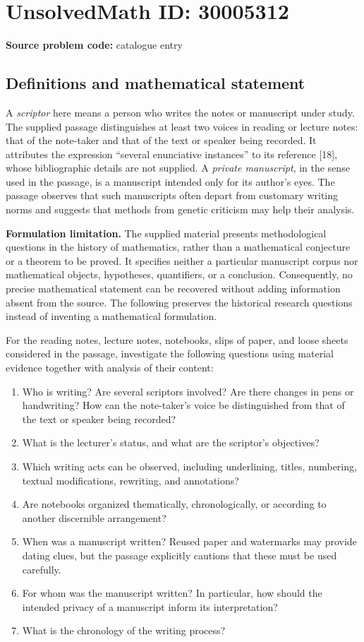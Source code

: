 \documentclass[11pt]{article}
\begin{document}
\section*{UnsolvedMath ID: 30005312}
\textbf{Source problem code:} catalogue entry
\subsection{Definitions and mathematical statement}
A \emph{scriptor} here means a person who writes the notes or manuscript under study. The supplied passage distinguishes at least two voices in reading or lecture notes: that of the note-taker and that of the text or speaker being recorded. It attributes the expression ``several enunciative instances'' to its reference [18], whose bibliographic details are not supplied. A \emph{private manuscript}, in the sense used in the passage, is a manuscript intended only for its author's eyes. The passage observes that such manuscripts often depart from customary writing norms and suggests that methods from genetic criticism may help their analysis.

\textbf{Formulation limitation.} The supplied material presents methodological questions in the history of mathematics, rather than a mathematical conjecture or a theorem to be proved. It specifies neither a particular manuscript corpus nor mathematical objects, hypotheses, quantifiers, or a conclusion. Consequently, no precise mathematical statement can be recovered without adding information absent from the source. The following preserves the historical research questions instead of inventing a mathematical formulation.

For the reading notes, lecture notes, notebooks, slips of paper, and loose sheets considered in the passage, investigate the following questions using material evidence together with analysis of their content:
\begin{enumerate}
\item Who is writing? Are several scriptors involved? Are there changes in pens or handwriting? How can the note-taker's voice be distinguished from that of the text or speaker being recorded?
\item What is the lecturer's status, and what are the scriptor's objectives?
\item Which writing acts can be observed, including underlining, titles, numbering, textual modifications, rewriting, and annotations?
\item Are notebooks organized thematically, chronologically, or according to another discernible arrangement?
\item When was a manuscript written? Reused paper and watermarks may provide dating clues, but the passage explicitly cautions that these must be used carefully.
\item For whom was the manuscript written? In particular, how should the intended privacy of a manuscript inform its interpretation?
\item What is the chronology of the writing process?
\end{enumerate}
\end{document}
